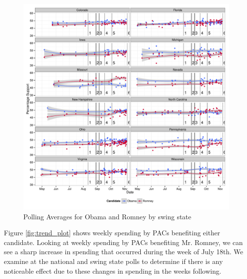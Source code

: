 \documentclass[11pt]{article}\usepackage{graphicx, color}
\newenvironment{knitrout}{}{} %
\begin{document}
\begin{knitrout}
\color{fgcolor}\begin{figure}[H]


{\centering \includegraphics[width=\textwidth]{figure/type_swing_1} 

}

\caption[Polling Averages for Obama and Romney by swing state]{Polling Averages for Obama and Romney by swing state\label{fig:type_swing_1}}
\end{figure}

\end{knitrout}




Figure \ref{fig:trend_plot} shows weekly spending by PACs benefiting either candidate. Looking at weekly spending by PACs benefiting Mr. Romney, we can see a sharp increase in spending that occurred during the week of July 18th. We examine at the national and swing state polls to determine if there is any noticeable effect due to these changes in spending in the weeks following.
\end{document}
